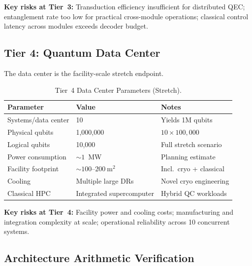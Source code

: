 \documentclass[conference]{IEEEtran}
\begin{document}
\textbf{Key risks at Tier~3:} Transduction efficiency insufficient for distributed QEC; entanglement rate too low for practical cross-module operations; classical control latency across modules exceeds decoder budget.

\subsection{Tier 4: Quantum Data Center}

The data center is the facility-scale stretch endpoint.

\begin{table}[htbp]
\centering
\caption{Tier~4 Data Center Parameters (Stretch).}
\label{tab:datacenter}
\begin{tabular}{llp{2.5cm}}
\toprule
\textbf{Parameter} & \textbf{Value} & \textbf{Notes} \\
\midrule
Systems/data center & 10 & Yields 1M qubits \\
Physical qubits & 1,000,000 & $10 \times 100{,}000$ \\
Logical qubits & 10,000 & Full stretch scenario \\
Power consumption & ${\sim}1$~MW & Planning estimate \\
Facility footprint & ${\sim}100$--$200~\text{m}^2$ & Incl.\ cryo + classical \\
Cooling & Multiple large DRs & Novel cryo engineering \\
Classical HPC & Integrated supercomputer & Hybrid QC workloads \\
\bottomrule
\end{tabular}
\end{table}

\textbf{Key risks at Tier~4:} Facility power and cooling costs; manufacturing and integration complexity at scale; operational reliability across 10 concurrent systems.

\subsection{Architecture Arithmetic Verification}
\end{document}
